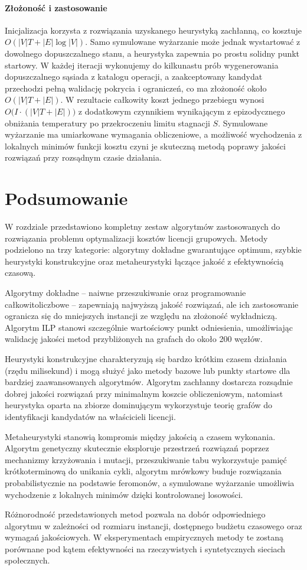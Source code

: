 \paragraph{Złożoność i zastosowanie}
Inicjalizacja korzysta z rozwiązania uzyskanego heurystyką zachłanną, co kosztuje $O(|V|T + |E|\log |V|)$. Samo symulowane wyżarzanie może jednak wystartować z dowolnego dopuszczalnego stanu, a heurystyka zapewnia po prostu solidny punkt startowy. W każdej iteracji wykonujemy do kilkunastu prób wygenerowania dopuszczalnego sąsiada z katalogu operacji, a zaakceptowany kandydat przechodzi pełną walidację pokrycia i ograniczeń, co ma złożoność około $O(|V|T + |E|)$. W rezultacie całkowity koszt jednego przebiegu wynosi $O\bigl(I \cdot (|V|T + |E|)\bigr)$ z dodatkowym czynnikiem wynikającym z epizodycznego obniżania temperatury po przekroczeniu limitu stagnacji $S$. Symulowane wyżarzanie ma umiarkowane wymagania obliczeniowe, a możliwość wychodzenia z lokalnych minimów funkcji kosztu czyni je skuteczną metodą poprawy jakości rozwiązań przy rozsądnym czasie działania.

\section{Podsumowanie}

W rozdziale przedstawiono kompletny zestaw algorytmów zastosowanych do rozwiązania problemu optymalizacji kosztów licencji grupowych. Metody podzielono na trzy kategorie: algorytmy dokładne gwarantujące optimum, szybkie heurystyki konstrukcyjne oraz metaheurystyki łączące jakość z efektywnością czasową.

Algorytmy dokładne -- naiwne przeszukiwanie oraz programowanie całkowitoliczbowe -- zapewniają najwyższą jakość rozwiązań, ale ich zastosowanie ogranicza się do mniejszych instancji ze względu na złożoność wykładniczą. Algorytm ILP stanowi szczególnie wartościowy punkt odniesienia, umożliwiając walidację jakości metod przybliżonych na grafach do około 200 węzłów.

Heurystyki konstrukcyjne charakteryzują się bardzo krótkim czasem działania (rzędu milisekund) i mogą służyć jako metody bazowe lub punkty startowe dla bardziej zaawansowanych algorytmów. Algorytm zachłanny dostarcza rozsądnie dobrej jakości rozwiązań przy minimalnym koszcie obliczeniowym, natomiast heurystyka oparta na zbiorze dominującym wykorzystuje teorię grafów do identyfikacji kandydatów na właścicieli licencji.

Metaheurystyki stanowią kompromis między jakością a czasem wykonania. Algorytm genetyczny skutecznie eksploruje przestrzeń rozwiązań poprzez mechanizmy krzyżowania i mutacji, przeszukiwanie tabu wykorzystuje pamięć krótkoterminową do unikania cykli, algorytm mrówkowy buduje rozwiązania probabilistycznie na podstawie feromonów, a symulowane wyżarzanie umożliwia wychodzenie z lokalnych minimów dzięki kontrolowanej losowości.

Różnorodność przedstawionych metod pozwala na dobór odpowiedniego algorytmu w zależności od rozmiaru instancji, dostępnego budżetu czasowego oraz wymagań jakościowych. W eksperymentach empirycznych metody te zostaną porównane pod kątem efektywności na rzeczywistych i syntetycznych sieciach społecznych.

